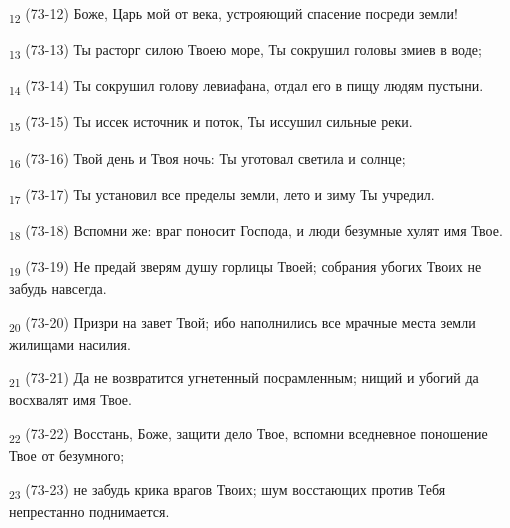 \begin{tcolorbox}
\textsubscript{12} (73-12) Боже, Царь мой от века, устрояющий спасение посреди земли!
\end{tcolorbox}
\begin{tcolorbox}
\textsubscript{13} (73-13) Ты расторг силою Твоею море, Ты сокрушил головы змиев в воде;
\end{tcolorbox}
\begin{tcolorbox}
\textsubscript{14} (73-14) Ты сокрушил голову левиафана, отдал его в пищу людям пустыни.
\end{tcolorbox}
\begin{tcolorbox}
\textsubscript{15} (73-15) Ты иссек источник и поток, Ты иссушил сильные реки.
\end{tcolorbox}
\begin{tcolorbox}
\textsubscript{16} (73-16) Твой день и Твоя ночь: Ты уготовал светила и солнце;
\end{tcolorbox}
\begin{tcolorbox}
\textsubscript{17} (73-17) Ты установил все пределы земли, лето и зиму Ты учредил.
\end{tcolorbox}
\begin{tcolorbox}
\textsubscript{18} (73-18) Вспомни же: враг поносит Господа, и люди безумные хулят имя Твое.
\end{tcolorbox}
\begin{tcolorbox}
\textsubscript{19} (73-19) Не предай зверям душу горлицы Твоей; собрания убогих Твоих не забудь навсегда.
\end{tcolorbox}
\begin{tcolorbox}
\textsubscript{20} (73-20) Призри на завет Твой; ибо наполнились все мрачные места земли жилищами насилия.
\end{tcolorbox}
\begin{tcolorbox}
\textsubscript{21} (73-21) Да не возвратится угнетенный посрамленным; нищий и убогий да восхвалят имя Твое.
\end{tcolorbox}
\begin{tcolorbox}
\textsubscript{22} (73-22) Восстань, Боже, защити дело Твое, вспомни вседневное поношение Твое от безумного;
\end{tcolorbox}
\begin{tcolorbox}
\textsubscript{23} (73-23) не забудь крика врагов Твоих; шум восстающих против Тебя непрестанно поднимается.
\end{tcolorbox}

